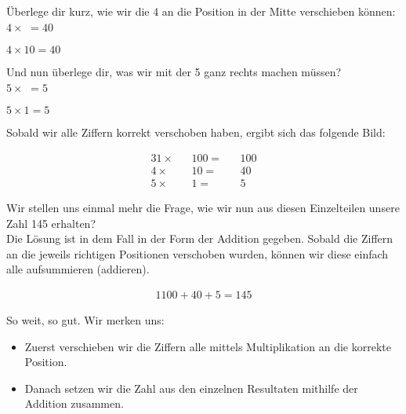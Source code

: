 \begin{exerciseseries}[columns=1,solsubrule=\hrule]{}
    \begin{exercise}
        Überlege dir kurz, wie wir die 4 an die Position in der Mitte verschieben können:\\
        $4 \times $\underline{\hspace{1cm}} $ = 40$
    \end{exercise}
    \begin{solution}
        $4 \times 10 = 40$
    \end{solution}

    \begin{exercise}
        Und nun überlege dir, was wir mit der 5 ganz rechts machen müssen?\\
        $5 \times $\underline{\hspace{1cm}} $ = 5$
    \end{exercise}
    \begin{solution}
        $5 \times 1 = 5$
    \end{solution}
\end{exerciseseries}

Sobald wir alle Ziffern korrekt verschoben haben, ergibt sich das folgende Bild:

\begin{alignat*}{3}
    1 \times && 100 = && 100\\
    4 \times && 10 = && 40\\
    5 \times && 1 = && 5
\end{alignat*}

Wir stellen uns einmal mehr die Frage, wie wir nun aus diesen Einzelteilen unsere Zahl 145 erhalten?\\
Die Lösung ist in dem Fall in der Form der Addition gegeben. Sobald die Ziffern an die jeweils richtigen Positionen
verschoben wurden, können wir diese einfach alle aufsummieren (addieren).

\begin{alignat*}{1}
    100 + 40 + 5 = 145
\end{alignat*}

So weit, so gut. Wir merken uns:
\begin{itemize}
    \item Zuerst verschieben wir die Ziffern alle mittels Multiplikation an die korrekte Position.
    \item Danach setzen wir die Zahl aus den einzelnen Resultaten mithilfe der Addition zusammen.
\end{itemize}

